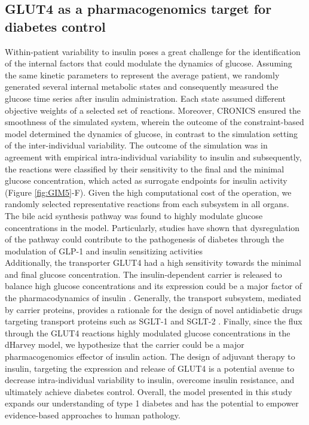 \subsection{GLUT4 as a pharmacogenomics target for diabetes control}
Within-patient variability to insulin poses a great challenge for the identification of the internal factors that could modulate the dynamics of glucose. Assuming the same kinetic parameters to represent the average patient, we randomly generated several internal metabolic states and consequently measured the glucose time series after insulin administration. Each state assumed different objective weights of a selected set of reactions. Moreover, CRONICS ensured the smoothness of the simulated system, wherein the outcome of the constraint-based model determined the dynamics of glucose, in contrast to the simulation setting of the inter-individual variability. The outcome of the simulation was in agreement with empirical intra-individual variability to insulin \cite{heinemann2002variability} and subsequently, the reactions were classified by their sensitivity to the final and the minimal glucose concentration, which acted as surrogate endpoints for insulin activity (Figure \ref{fig:GIM5}-F). 
Given the high computational cost of the operation, we randomly selected representative reactions from each subsystem in all organs. The bile acid synthesis pathway was found to highly modulate glucose concentrations in the model. Particularly, studies have shown that dysregulation of the pathway could contribute to the pathogenesis of diabetes through the modulation of GLP-1 and insulin sensitizing activities \cite{prawitt2011bile,tomkin2016obesity}\\
Additionally, the transporter GLUT4 had a high sensitivity towards the minimal and final glucose concentration. The insulin-dependent carrier is released to balance high glucose concentrations and its expression could be a major factor of the pharmacodynamics of insulin \cite{correa2013slc2a4}. Generally, the transport subsystem, mediated by carrier proteins, provides a rationale for the design of novel antidiabetic drugs targeting transport proteins such as SGLT-1 \cite{sands2015sotagliflozin} and SGLT-2 \cite{verma2017metabolodiuretic}. 
Finally, since the flux through the GLUT4 reactions highly modulated glucose concentrations in the dHarvey model, we hypothesize that the carrier could be a major pharmacogenomics effector of insulin action. The design  of adjuvant therapy to insulin, targeting the expression and release of GLUT4 is a potential avenue to decrease intra-individual variability to insulin, overcome insulin resistance, and ultimately achieve diabetes control. Overall, the model presented in this study expands our understanding of type 1 diabetes and has the potential to empower evidence-based approaches to human pathology.

